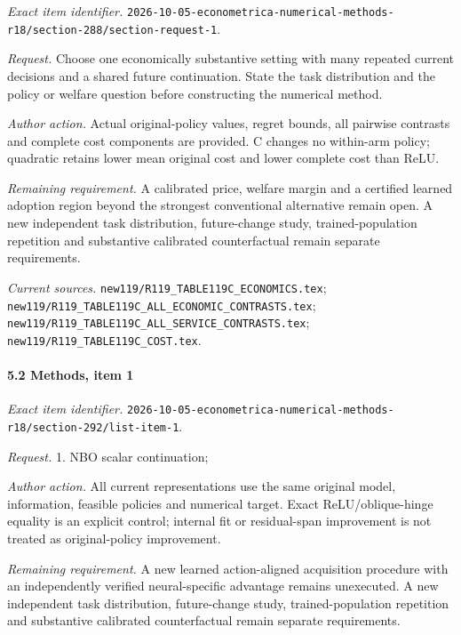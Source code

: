 \emph{Exact item identifier.} \nolinkurl{2026-10-05-econometrica-numerical-methods-r18/section-288/section-request-1}.

\par\emph{Request.} Choose one economically substantive setting with many repeated current decisions and a shared future continuation. State the task distribution and the policy or welfare question before constructing the numerical method.

\par\emph{Author action.} Actual original-policy values, regret bounds, all pairwise contrasts and complete cost components are provided. C changes no within-arm policy; quadratic retains lower mean original cost and lower complete cost than ReLU.

\par\emph{Remaining requirement.} A calibrated price, welfare margin and a certified learned adoption region beyond the strongest conventional alternative remain open. A new independent task distribution, future-change study, trained-population repetition and substantive calibrated counterfactual remain separate requirements.

\par\emph{Current sources.} \nolinkurl{new119/R119_TABLE119C_ECONOMICS.tex}; \nolinkurl{new119/R119_TABLE119C_ALL_ECONOMIC_CONTRASTS.tex}; \nolinkurl{new119/R119_TABLE119C_ALL_SERVICE_CONTRASTS.tex}; \nolinkurl{new119/R119_TABLE119C_COST.tex}.

\paragraph{5.2 Methods, item 1}

\emph{Exact item identifier.} \nolinkurl{2026-10-05-econometrica-numerical-methods-r18/section-292/list-item-1}.

\par\emph{Request.} 1. NBO scalar continuation;

\par\emph{Author action.} All current representations use the same original model, information, feasible policies and numerical target. Exact ReLU/\allowbreak{}oblique-hinge equality is an explicit control; internal fit or residual-span improvement is not treated as original-policy improvement.

\par\emph{Remaining requirement.} A new learned action-aligned acquisition procedure with an independently verified neural-specific advantage remains unexecuted. A new independent task distribution, future-change study, trained-population repetition and substantive calibrated counterfactual remain separate requirements.

